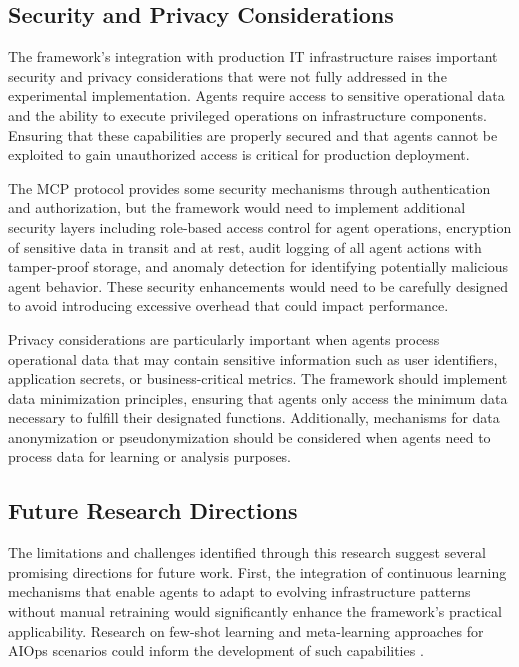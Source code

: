 \documentclass{article}
\begin{document}
\subsection{Security and Privacy Considerations}

The framework's integration with production IT infrastructure raises important security and privacy considerations that were not fully addressed in the experimental implementation. Agents require access to sensitive operational data and the ability to execute privileged operations on infrastructure components. Ensuring that these capabilities are properly secured and that agents cannot be exploited to gain unauthorized access is critical for production deployment.

The MCP protocol provides some security mechanisms through authentication and authorization, but the framework would need to implement additional security layers including role-based access control for agent operations, encryption of sensitive data in transit and at rest, audit logging of all agent actions with tamper-proof storage, and anomaly detection for identifying potentially malicious agent behavior. These security enhancements would need to be carefully designed to avoid introducing excessive overhead that could impact performance.

Privacy considerations are particularly important when agents process operational data that may contain sensitive information such as user identifiers, application secrets, or business-critical metrics. The framework should implement data minimization principles, ensuring that agents only access the minimum data necessary to fulfill their designated functions. Additionally, mechanisms for data anonymization or pseudonymization should be considered when agents need to process data for learning or analysis purposes.

\subsection{Future Research Directions}

The limitations and challenges identified through this research suggest several promising directions for future work. First, the integration of continuous learning mechanisms that enable agents to adapt to evolving infrastructure patterns without manual retraining would significantly enhance the framework's practical applicability. Research on few-shot learning and meta-learning approaches for AIOps scenarios could inform the development of such capabilities \cite{duan2024}.
\end{document}
